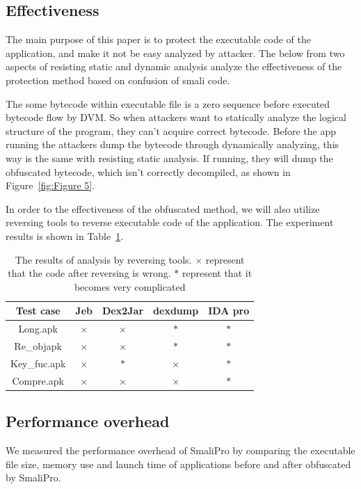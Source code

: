 \subsection{Effectiveness}
The main purpose of this paper is to protect the executable code of the application, and make it not be easy analyzed by attacker. The below from two aspects of resisting static and dynamic  analysis analyze the effectiveness of the protection method based on confusion of smali code.

The some bytecode within executable file is a zero sequence before executed bytecode flow by DVM. So when attackers want to statically analyze the logical structure of the program, they can't acquire correct bytecode. Before the app running the attackers dump the bytecode through dynamically analyzing, this way is the same with resisting static analysis. If running, they will dump the obfuscated bytecode, which isn't correctly decompiled, as shown in Figure~\ref{fig:Figure 5}.

In order to the effectiveness of the obfuscated method, we will also utilize reversing tools to reverse executable code of the application. The experiment results is shown in Table~\ref{tab:Table 2}.

\begin{table}[htbp]
  \centering
  \begin{tabular}{c c c c c}
  \toprule
  Test case & Jeb & Dex2Jar & dexdump & IDA pro\\
  \hline
  \hline

  Long.apk  & $\times$ & $\times$ & $\ast$ & $\ast$\\


  Re\_objapk & $\times$ & $\times$ & $\ast$ & $\ast$\\


  Key\_fuc.apk & $\times$ & $\ast$ & $\times$ & $\ast$\\


  Compre.apk & $\times$ & $\times$ & $\times$ & $\ast$\\
  \bottomrule
  \end{tabular}
   \caption{The results of analysis by reversing tools. $\times$ represent that the code after reversing is wrong. $\ast$ represent that it becomes very complicated}\label{tab:Table 2}
\end{table}

\subsection{Performance overhead}
We measured the performance overhead of SmaliPro by comparing the executable file size, memory use and launch time of applications before and after obfuscated by SmaliPro.

